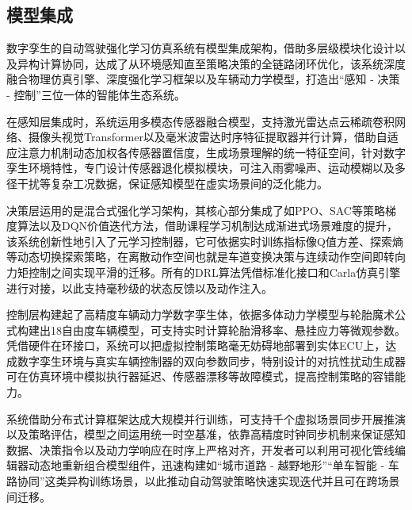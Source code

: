 \subsection{模型集成}

数字孪生的自动驾驶强化学习仿真系统有模型集成架构，借助多层级模块化设计以及异构计算协同，达成了从环境感知直至策略决策的全链路闭环优化，该系统深度融合物理仿真引擎、深度强化学习框架以及车辆动力学模型，打造出“感知 - 决策 - 控制”三位一体的智能体生态系统。

在感知层集成时，系统运用多模态传感器融合模型，支持激光雷达点云稀疏卷积网络、摄像头视觉Transformer以及毫米波雷达时序特征提取器并行计算，借助自适应注意力机制动态加权各传感器置信度，生成场景理解的统一特征空间，针对数字孪生环境特性，专门设计传感器退化模拟模块，可注入雨雾噪声、运动模糊以及多径干扰等复杂工况数据，保证感知模型在虚实场景间的泛化能力。

决策层运用的是混合式强化学习架构，其核心部分集成了如PPO、SAC等策略梯度算法以及DQN价值迭代方法，借助课程学习机制达成渐进式场景难度的提升，该系统创新性地引入了元学习控制器，它可依据实时训练指标像Q值方差、探索熵等动态切换探索策略，在离散动作空间也就是车道变换决策与连续动作空间即转向力矩控制之间实现平滑的迁移。所有的DRL算法凭借标准化接口和Carla仿真引擎进行对接，以此支持毫秒级的状态反馈以及动作注入。

控制层构建起了高精度车辆动力学数字孪生体，依据多体动力学模型与轮胎魔术公式构建出18自由度车辆模型，可支持实时计算轮胎滑移率、悬挂应力等微观参数。凭借硬件在环接口，系统可以把虚拟控制策略毫无妨碍地部署到实体ECU上，达成数字孪生环境与真实车辆控制器的双向参数同步，特别设计的对抗性扰动生成器可在仿真环境中模拟执行器延迟、传感器漂移等故障模式，提高控制策略的容错能力。

系统借助分布式计算框架达成大规模并行训练，可支持千个虚拟场景同步开展推演以及策略评估，模型之间运用统一时空基准，依靠高精度时钟同步机制来保证感知数据、决策指令以及动力学响应在时序上严格对齐，开发者可以利用可视化管线编辑器动态地重新组合模型组件，迅速构建如“城市道路 - 越野地形”“单车智能 - 车路协同”这类异构训练场景，以此推动自动驾驶策略快速实现迭代并且可在跨场景间迁移。

